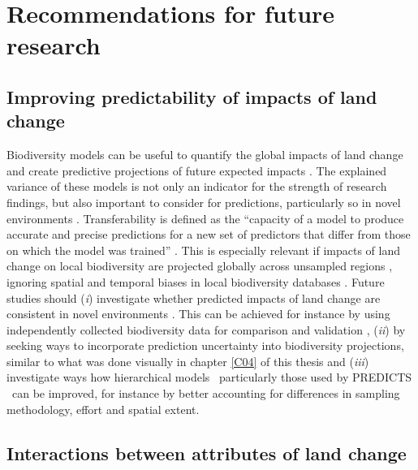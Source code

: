 \section{Recommendations for future research}
\label{C06_04}
\subsection{Improving predictability of impacts of land change}
\label{C06_0401}

Biodiversity models can be useful to quantify the global impacts of land change and create predictive projections of future expected impacts \citep{Purvis2018}. The explained variance of these models is not only an indicator for the strength of research findings, but also important to consider for predictions, particularly so in novel environments \citep{Yates2018}. Transferability is defined as the “capacity of a model to produce accurate and precise predictions for a new set of predictors that differ from those on which the model was trained” \citep{Yates2018}. This is especially relevant if impacts of land change on local biodiversity are projected globally across unsampled regions \citep{Newbold2015,Purvis2018}, ignoring spatial and temporal biases in local biodiversity databases \citep{Martin2012,Hudson2014,Gonzalez2016}. Future studies should (\textit{i}) investigate whether predicted impacts of land change are consistent in novel environments \citep{Yates2018}. This can be achieved for instance by using independently collected biodiversity data for comparison and validation \citep{Jung2016}, (\textit{ii}) by seeking ways to incorporate prediction uncertainty into biodiversity projections, similar to what was done visually in chapter \ref{C04} of this thesis and (\textit{iii}) investigate ways how hierarchical models \textendash\ particularly those used by PREDICTS \citep{Purvis2018} \textendash\ can be improved, for instance by better accounting for differences in sampling methodology, effort and spatial extent.  

\subsection{Interactions between attributes of land change}
\label{C06_0402}

